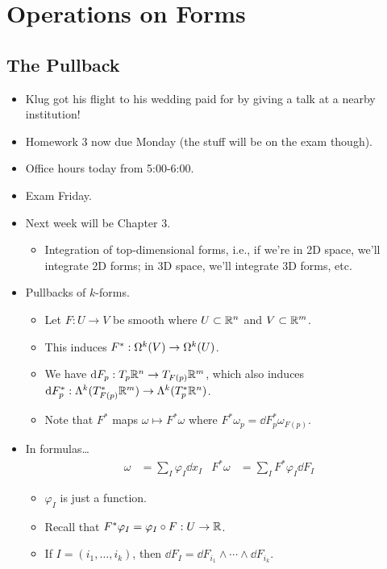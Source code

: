 \documentclass[../notes.tex]{subfiles}
\begin{document}
\chapter{Operations on Forms}
\section{The Pullback}
\begin{itemize}
    \item {}Klug got his flight to his wedding paid for by giving a talk at a nearby institution!
    \item Homework 3 now due Monday (the stuff will be on the exam though).
    \item Office hours today from 5:00-6:00.
    \item Exam Friday.
    \item Next week will be Chapter 3.
    \begin{itemize}
        \item Integration of top-dimensional forms, i.e., if we're in 2D space, we'll integrate 2D forms; in 3D space, we'll integrate 3D forms, etc.
    \end{itemize}
    \item Pullbacks of $k$-forms.
    \begin{itemize}
        \item Let $F:U\to V$ be smooth where $U\subset\R^n$ and $V\subset\R^m$.
        \item This induces $F^*:\ome[k]{V}\to\ome[k]{U}$.
        \item We have $\dd{F_p}:T_p\R^n\to T_{F(p)}\R^m$, which also induces $\dd{F_p^*}:\lam[k]{T_{F(p)}^*\R^m}\to\lam[k]{T_p^*\R^n}$.
        \item Note that $F^*$ maps $\omega\mapsto F^*\omega$ where $F^*\omega_p=\dd{F_p^*\omega_{F(p)}}$.
    \end{itemize}
    \item In formulas\dots
    \begin{align*}
        \omega &= \sum_I\varphi_I\dd{x_I}&
        F^*\omega &= \sum_IF^*\varphi_I\dd{F_I}
    \end{align*}
    \begin{itemize}
        \item $\varphi_I$ is just a function.
        \item Recall that $F^*\varphi_I=\varphi_I\circ F:U\to\R$.
        \item If $I=(i_1,\dots,i_k)$, then $\dd{F_I}=\dd{F_{i_1}}\wedge\cdots\wedge\dd{F_{i_k}}$.

\end{itemize}
\end{itemize}
\end{document}
